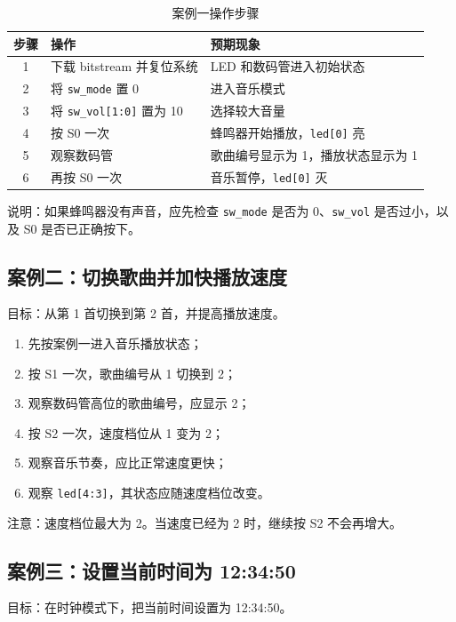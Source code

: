 \documentclass[UTF8,a4paper,12pt]{ctexart}
\newcommand{\port}[1]{\texttt{#1}}
\begin{document}
\begin{table}[H]
  \centering
  \caption{案例一操作步骤}
  \begin{tabular}{cll}
    \toprule
    步骤 & 操作 & 预期现象 \\
    \midrule
    1 & 下载 bitstream 并复位系统 & LED 和数码管进入初始状态 \\
    2 & 将 \port{sw\_mode} 置 0 & 进入音乐模式 \\
    3 & 将 \port{sw\_vol[1:0]} 置为 10 & 选择较大音量 \\
    4 & 按 S0 一次 & 蜂鸣器开始播放，\port{led[0]} 亮 \\
    5 & 观察数码管 & 歌曲编号显示为 1，播放状态显示为 1 \\
    6 & 再按 S0 一次 & 音乐暂停，\port{led[0]} 灭 \\
    \bottomrule
  \end{tabular}
\end{table}

说明：如果蜂鸣器没有声音，应先检查 \port{sw\_mode} 是否为 0、\port{sw\_vol} 是否过小，以及 S0 是否已正确按下。

\subsection{案例二：切换歌曲并加快播放速度}

目标：从第 1 首切换到第 2 首，并提高播放速度。

\begin{enumerate}
  \item 先按案例一进入音乐播放状态；
  \item 按 S1 一次，歌曲编号从 1 切换到 2；
  \item 观察数码管高位的歌曲编号，应显示 2；
  \item 按 S2 一次，速度档位从 1 变为 2；
  \item 观察音乐节奏，应比正常速度更快；
  \item 观察 \port{led[4:3]}，其状态应随速度档位改变。
\end{enumerate}

注意：速度档位最大为 2。当速度已经为 2 时，继续按 S2 不会再增大。

\subsection{案例三：设置当前时间为 12:34:50}

目标：在时钟模式下，把当前时间设置为 12:34:50。
\end{document}

